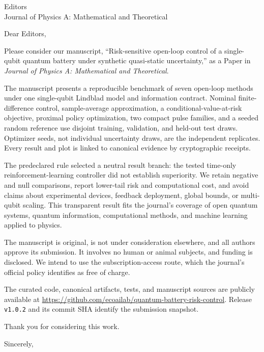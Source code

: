 \documentclass[10pt]{letter}
\begin{document}
\begin{letter}{Editors\\Journal of Physics A: Mathematical and Theoretical}
\opening{Dear Editors,}

Please consider our manuscript, ``Risk-sensitive open-loop control of a single-qubit quantum battery under synthetic quasi-static uncertainty,'' as a Paper in \emph{Journal of Physics A: Mathematical and Theoretical}.

The manuscript presents a reproducible benchmark of seven open-loop methods under one single-qubit Lindblad model and information contract.  Nominal finite-difference control, sample-average approximation, a conditional-value-at-risk objective, proximal policy optimization, two compact pulse families, and a seeded random reference use disjoint training, validation, and held-out test draws.  Optimizer seeds, not individual uncertainty draws, are the independent replicates.  Every result and plot is linked to canonical evidence by cryptographic receipts.

The predeclared rule selected a neutral result branch: the tested time-only reinforcement-learning controller did not establish superiority.  We retain negative and null comparisons, report lower-tail risk and computational cost, and avoid claims about experimental devices, feedback deployment, global bounds, or multi-qubit scaling.  This transparent result fits the journal's coverage of open quantum systems, quantum information, computational methods, and machine learning applied to physics.

The manuscript is original, is not under consideration elsewhere, and all authors approve its submission.  It involves no human or animal subjects, and funding is disclosed.  We intend to use the subscription-access route, which the journal's official policy identifies as free of charge.

The curated code, canonical artifacts, tests, and manuscript sources are publicly available at \url{https://github.com/ecoailab/quantum-battery-risk-control}.  Release \texttt{v1.0.2} and its commit SHA identify the submission snapshot.

Thank you for considering this work.

\closing{Sincerely,}
\end{letter}
\end{document}

